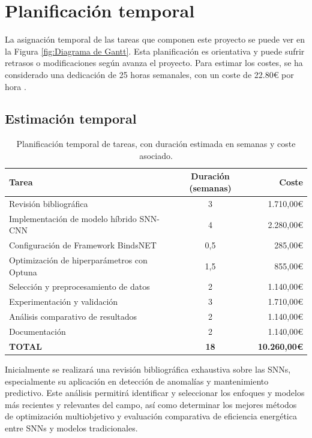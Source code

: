 \section{Planificación temporal}

La asignación temporal de las tareas que componen este proyecto se puede ver en la Figura \ref{fig:Diagrama de Gantt}. Esta planificación es orientativa y puede sufrir retrasos o modificaciones según avanza el proyecto. Para estimar los costes, se ha considerado una dedicación de 25 horas semanales, con un coste de 22.80€ por hora \cite{Talent.com_2024}.

\subsection{Estimación temporal}

\begin{table}[htbp]
\centering
\begin{tabular}{lcr}
\hline \hline
\textbf{Tarea} & \textbf{Duración (semanas)} & \textbf{Coste} \\
\hline
Revisión bibliográfica & 3 & 1.710,00€ \\
Implementación de modelo híbrido SNN-CNN & 4 & 2.280,00€ \\
Configuración de Framework BindsNET & 0,5 & 285,00€ \\
Optimización de hiperparámetros con Optuna & 1,5 & 855,00€ \\
Selección y preprocesamiento de datos & 2 & 1.140,00€ \\
Experimentación y validación & 3 & 1.710,00€ \\
Análisis comparativo de resultados & 2 & 1.140,00€ \\
Documentación  & 2 & 1.140,00€ \\
\hline
\textbf{TOTAL} & \textbf{18} & \textbf{10.260,00€} \\
\hline \hline
\end{tabular}
\caption{Planificación temporal de tareas, con duración estimada en semanas y coste asociado.}
\label{tab:planificacion_tareas}
\end{table}

Inicialmente se realizará una revisión bibliográfica exhaustiva sobre las SNNs, especialmente su aplicación en detección de anomalías y mantenimiento predictivo. Este análisis permitirá identificar y seleccionar los enfoques y modelos más recientes y relevantes del campo, así como determinar los mejores métodos de optimización multiobjetivo y evaluación comparativa de eficiencia energética entre SNNs y modelos tradicionales.

